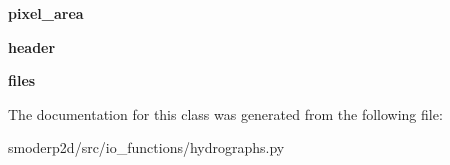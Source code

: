 \begin{DoxyCompactItemize}
\item 
\hypertarget{classsmoderp2d_1_1src_1_1io__functions_1_1hydrographs_1_1Hydrographs_a2ba88b55e9014ae1591c0d687b429248}{{\bfseries pixel\-\_\-area}}\label{classsmoderp2d_1_1src_1_1io__functions_1_1hydrographs_1_1Hydrographs_a2ba88b55e9014ae1591c0d687b429248}

\item 
\hypertarget{classsmoderp2d_1_1src_1_1io__functions_1_1hydrographs_1_1Hydrographs_a699682863e80d885651ab31f68949e0d}{{\bfseries header}}\label{classsmoderp2d_1_1src_1_1io__functions_1_1hydrographs_1_1Hydrographs_a699682863e80d885651ab31f68949e0d}

\item 
\hypertarget{classsmoderp2d_1_1src_1_1io__functions_1_1hydrographs_1_1Hydrographs_a656de4c1982efe371c36388bef0ec844}{{\bfseries files}}\label{classsmoderp2d_1_1src_1_1io__functions_1_1hydrographs_1_1Hydrographs_a656de4c1982efe371c36388bef0ec844}

\end{DoxyCompactItemize}


The documentation for this class was generated from the following file\-:\begin{DoxyCompactItemize}
\item 
smoderp2d/src/io\-\_\-functions/hydrographs.\-py\end{DoxyCompactItemize}
